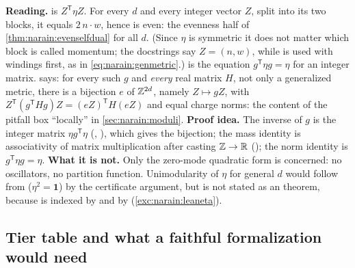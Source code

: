 \begin{leanbox}
\textbf{Reading.}  is $Z^{\mathsf T}\eta Z$. For every $d$ and every integer
vector $Z$, split into its two blocks, it equals $2\,n\cdot w$, hence is even: the evenness
half of \cref{thm:narain:evenselfdual} for all $d$. (Since $\eta$ is symmetric it does not
matter which block is called momentum; the docstrings say $Z=(n,w)$, while 
is used with windings first, as in \eqref{eq:narain:genmetric}.)  is the
equation $g^{\mathsf T}\eta g=\eta$ for an integer matrix.  says: for
every such $g$ and \emph{every} real matrix $H$, not only a generalized metric, there is a
bijection $e$ of $\mathbb{Z}^{2d}$, namely $Z\mapsto gZ$, with
$Z^{\mathsf T}(g^{\mathsf T}Hg)Z=(eZ)^{\mathsf T}H(eZ)$ and equal charge norms: the content of the
pitfall box ``locally'' in \cref{sec:narain:moduli}. \textbf{Proof idea.} The inverse of $g$
is the integer matrix $\eta g^{\mathsf T}\eta$ (,
), which gives the bijection; the mass identity is associativity of
matrix multiplication after casting $\mathbb{Z}\to\mathbb{R}$ (); the norm identity
is $g^{\mathsf T}\eta g=\eta$. \textbf{What it is not.} Only the zero-mode quadratic form is
concerned: no oscillators, no partition function. Unimodularity of $\eta$ for general $d$
would follow from  ($\eta^2=\mathbf 1$) by the certificate argument, but is
not stated as an  theorem, because  is indexed by 
and  by  (\cref{exc:narain:leaneta}).
\end{leanbox}

\subsection{Tier table and what a faithful formalization would need}

